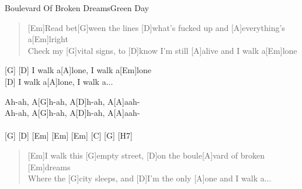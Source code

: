 \begin{song}{Boulevard Of Broken Dreams}{Green Day}
    \begin{verse}  
        [Em]Read bet[G]ween the lines [D]what's fucked up and [A]everything's a[Em]lright\\
        Check my [G]vital signs, to [D]know I'm still [A]alive and I walk a[Em]lone
    \end{verse}  

    \begin{interlude}
        [(Em)] \hspace{1em} [G] \hspace{1em} [D] I walk a[A]lone, I walk a[Em]lone\\
        [G] \hspace{1em} [D] I walk a[A]lone, I walk a...
    \end{interlude}


    \begin{interlude}
        [Em]Ah-ah, A[G]h-ah, A[D]h-ah, A[A]aah- \\
        [Em]Ah-ah, A[G]h-ah, A[D]h-ah, A[A]aah- \\
        \\
        [C] [G] [D] [Em] [Em] [Em] \hspace{3em} [C] [G] [H7]
    \end{interlude}

    \begin{verse}  
        [Em]I walk this [G]empty street, [D]on the boule[A]vard of broken [Em]dreams \\
        Where the [G]city sleeps, and [D]I'm the only [A]one and I walk a...
    \end{verse}  


\end{song}
